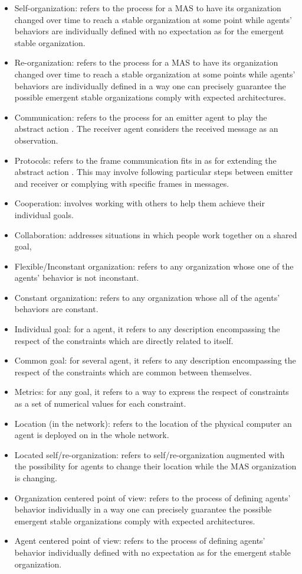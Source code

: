 \documentclass[conference]{IEEEtran}
\begin{document}
\begin{itemize}
    \item Self-organization: refers to the process for a MAS to have its organization changed over time to reach a stable organization at some point while agents' behaviors are individually defined with no expectation as for the emergent stable organization.
    \item Re-organization: refers to the process for a MAS to have its organization changed over time to reach a stable organization at some points while agents' behaviors are individually defined in a way one can precisely guarantee the possible emergent stable organizations comply with expected architectures.
    \item Communication: refers to the process for an emitter agent to play the abstract action . The receiver agent considers the received message as an observation.
    \item Protocols: refers to the frame communication fits in as for extending the abstract action . This may involve following particular steps between emitter and receiver or complying with specific frames in messages.
    \item Cooperation: involves working with others to help them achieve their individual goals.
    \item Collaboration: addresses situations in which people work together on a shared goal,
    \item Flexible/Inconstant organization: refers to any organization whose one of the agents' behavior is not inconstant.
    \item Constant organization: refers to any organization whose all of the agents' behaviors are constant.
    \item Individual goal: for a agent, it refers to any description encompassing the respect of the constraints which are directly related to itself.
    \item Common goal: for several agent, it refers to any description encompassing the respect of the constraints which are common between themselves.
    \item Metrics: for any goal, it refers to a way to express the respect of constraints as a set of numerical values for each constraint.
    \item Location (in the network): refers to the location of the physical computer an agent is deployed on in the whole network.
    \item Located self/re-organization: refers to self/re-organization augmented with the possibility for agents to change their location while the MAS organization is changing.
    \item Organization centered point of view: refers to the process of defining agents' behavior individually in a way one can precisely guarantee the possible emergent stable organizations comply with expected architectures.
    \item Agent centered point of view: refers to the process of defining agents' behavior individually defined with no expectation as for the emergent stable organization.
\end{itemize}
\end{document}

